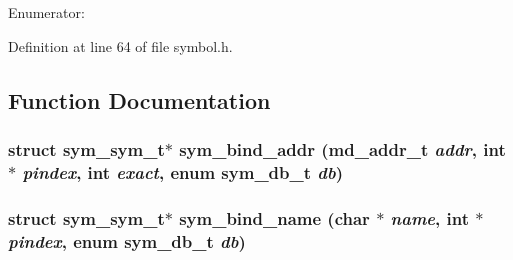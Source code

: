 \begin{Desc}
\item[Enumerator: ]\par
\begin{description}
\item[{\em 
ss\_\-data\label{symbol_8h_a1afe27f02a7265d74e5bdc212ebd6334c89cafd5240b6b75d3205d13f588658}
}]\item[{\em 
ss\_\-text\label{symbol_8h_a1afe27f02a7265d74e5bdc212ebd633315471628ad97a6711b60a5a975480ec}
}]\item[{\em 
ss\_\-NUM\label{symbol_8h_a1afe27f02a7265d74e5bdc212ebd6338dfb7d7d8ed483a01fe758b6633c948d}
}]\end{description}
\end{Desc}



Definition at line 64 of file symbol.h.

\subsection{Function Documentation}
\subsubsection[{sym\_\-bind\_\-addr}]{\setlength{\rightskip}{0pt plus 5cm}struct {\bf sym\_\-sym\_\-t}$\ast$ sym\_\-bind\_\-addr ({\bf md\_\-addr\_\-t} {\em addr}, \/  int $\ast$ {\em pindex}, \/  int {\em exact}, \/  enum {\bf sym\_\-db\_\-t} {\em db})\hspace{0.3cm}{\tt  [read]}}\label{symbol_8h_eb593eb256a5c4165c818dc260c0e6fe}


\subsubsection[{sym\_\-bind\_\-name}]{\setlength{\rightskip}{0pt plus 5cm}struct {\bf sym\_\-sym\_\-t}$\ast$ sym\_\-bind\_\-name (char $\ast$ {\em name}, \/  int $\ast$ {\em pindex}, \/  enum {\bf sym\_\-db\_\-t} {\em db})\hspace{0.3cm}{\tt  [read]}}\label{symbol_8h_48adab8d080804518e86f2513fca3f5f}



